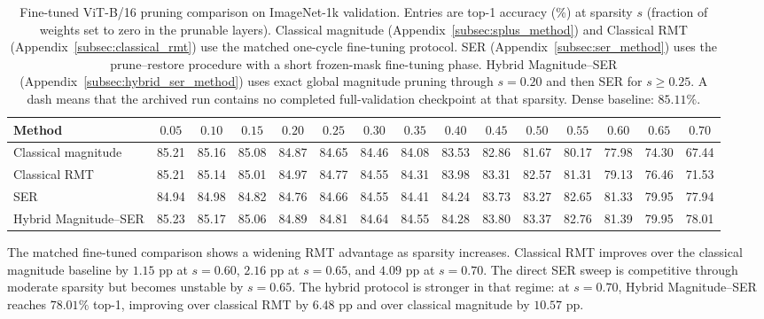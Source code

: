 \documentclass[11pt]{article}
\theoremstyle{plain}
\theoremstyle{definition}
\theoremstyle{remark}
\newcommand{\1}{\mathbf{1}}
\begin{document}
\begin{table}[ht]
\centering
\caption{Fine-tuned ViT-B/16 pruning comparison on ImageNet-1k validation.  Entries are top-1 accuracy (\%) at sparsity \(s\) (fraction of weights set to zero in the prunable layers).  Classical magnitude (Appendix~\ref{subsec:splus_method}) and Classical RMT (Appendix~\ref{subsec:classical_rmt}) use the matched one-cycle fine-tuning protocol.  SER (Appendix~\ref{subsec:ser_method}) uses the prune--restore procedure with a short frozen-mask fine-tuning phase.  Hybrid Magnitude--SER (Appendix~\ref{subsec:hybrid_ser_method}) uses exact global magnitude pruning through \(s=0.20\) and then SER for \(s\ge0.25\).  A dash means that the archived run contains no completed full-validation checkpoint at that sparsity.  Dense baseline: \(85.11\%\).}
\label{tab:vitb_current_methods}
\scriptsize
\setlength{\tabcolsep}{2.5pt}
\begin{tabular}{lcccccccccccccc}
\toprule
Method & \(0.05\) & \(0.10\) & \(0.15\) & \(0.20\) & \(0.25\) & \(0.30\) & \(0.35\) & \(0.40\) & \(0.45\) & \(0.50\) & \(0.55\) & \(0.60\) & \(0.65\) & \(0.70\) \\
\midrule
Classical magnitude   & 85.21 & 85.16 & 85.08 & 84.87 & 84.65 & 84.46 & 84.08 & 83.53 & 82.86 & 81.67 & 80.17 & 77.98 & 74.30 & 67.44 \\
Classical RMT         & 85.21 & 85.14 & 85.01 & 84.97 & 84.77 & 84.55 & 84.31 & 83.98 & 83.31 & 82.57 & 81.31 & 79.13 & 76.46 & 71.53 \\
SER                   & 84.94 & 84.98 & 84.82 & 84.76 & 84.66 & 84.55 & 84.41 & 84.24 & 83.73 & 83.27 & 82.65 & 81.33 & 79.95 & 77.94 \\
Hybrid Magnitude--SER & 85.23 & 85.17 & 85.06 & 84.89 & 84.81 & 84.64 & 84.55 & 84.28 & 83.80 & 83.37 & 82.76 & 81.39 & 79.95 & 78.01 \\
\bottomrule
\end{tabular}
\end{table}

The matched fine-tuned comparison shows a widening RMT advantage as sparsity increases.  Classical RMT improves over the classical magnitude baseline by \(1.15\) pp at \(s=0.60\), \(2.16\) pp at \(s=0.65\), and \(4.09\) pp at \(s=0.70\).  The direct SER sweep is competitive through moderate sparsity but becomes unstable by \(s=0.65\).  The hybrid protocol is stronger in that regime: at \(s=0.70\), Hybrid Magnitude--SER reaches \(78.01\%\) top-1, improving over classical RMT by \(6.48\) pp and over classical magnitude by \(10.57\) pp.
\end{document}
